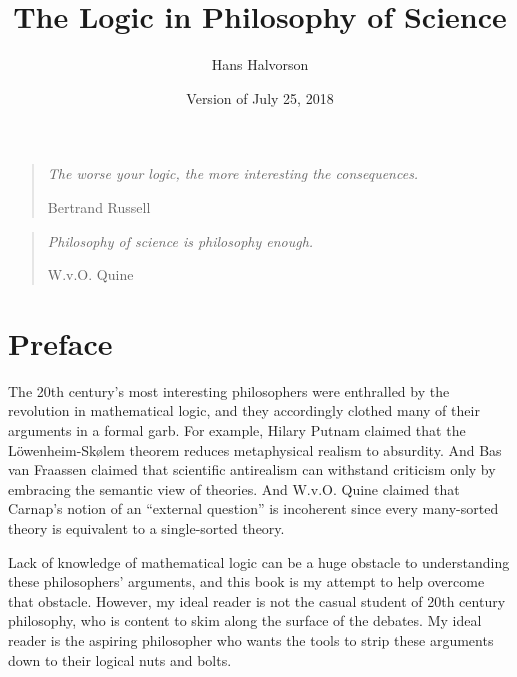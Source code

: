 \documentclass[12pt,fleqn,toc]{book}
\title{The Logic in Philosophy of Science}
\author{Hans Halvorson}
\date{Version of July 25, 2018}
\numberwithin{section}{chapter}
\numberwithin{subsection}{section}
\numberwithin{prop}{section}
\theoremstyle{definition}
\newcommand{\2}{\mathscr}
\newcommand{\7}{\mathbb}
\begin{document}
\frontmatter

\maketitle



\clearpage
\vspace*{\fill}
\thispagestyle{empty} %

\begin{quotation}
  \noindent \large {\em The worse your logic, the more interesting the
    \mbox{consequences}.}

\medskip
\raggedleft
Bertrand Russell
\end{quotation}
\bigskip

\begin{quotation}
  \large {\em Philosophy of science is philosophy enough.}

\medskip
\raggedleft
W.v.O. Quine
\end{quotation}




\tableofcontents

\chapter{Preface}

The 20th century's most interesting philosophers were enthralled by
the revolution in mathematical logic, and they accordingly clothed
many of their arguments in a formal garb.  For example, Hilary Putnam
claimed that the L\"owenheim-Sk{\o}lem theorem reduces metaphysical
realism to absurdity.  And Bas van Fraassen claimed that scientific
antirealism can withstand criticism only by embracing the semantic
view of theories.  And W.v.O. Quine claimed that Carnap's notion of an
``external question'' is incoherent since every many-sorted theory is
equivalent to a single-sorted theory.

Lack of knowledge of mathematical logic can be a huge obstacle to
understanding these philosophers' arguments, and this book is my
attempt to help overcome that obstacle.  However, my ideal reader is
not the casual student of 20th century philosophy, who is content to
skim along the surface of the debates.  My ideal reader is the
aspiring philosopher who wants the tools to strip these arguments down
to their logical nuts and bolts.
\end{document}
